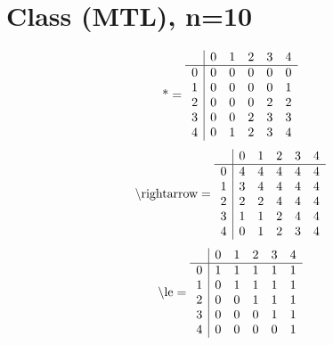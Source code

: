 \documentclass[11pt]{article}
\begin{document}
\section{Class (MTL), n=10}
\[\text{*} = 
\begin{array}{r | r r r r r}
 & 0 & 1 & 2 & 3 & 4 \\ \hline
0 & 0 & 0 & 0 & 0 & 0 \\
1 & 0 & 0 & 0 & 0 & 1 \\
2 & 0 & 0 & 0 & 2 & 2 \\
3 & 0 & 0 & 2 & 3 & 3 \\
4 & 0 & 1 & 2 & 3 & 4 \\
\end{array}
\]
\[\text{\textbackslash rightarrow} = 
\begin{array}{r | r r r r r}
 & 0 & 1 & 2 & 3 & 4 \\ \hline
0 & 4 & 4 & 4 & 4 & 4 \\
1 & 3 & 4 & 4 & 4 & 4 \\
2 & 2 & 2 & 4 & 4 & 4 \\
3 & 1 & 1 & 2 & 4 & 4 \\
4 & 0 & 1 & 2 & 3 & 4 \\
\end{array}
\]
\[\text{\textbackslash le} = 
\begin{array}{r | r r r r r}
 & 0 & 1 & 2 & 3 & 4 \\ \hline
0 & 1 & 1 & 1 & 1 & 1 \\
1 & 0 & 1 & 1 & 1 & 1 \\
2 & 0 & 0 & 1 & 1 & 1 \\
3 & 0 & 0 & 0 & 1 & 1 \\
4 & 0 & 0 & 0 & 0 & 1 \\
\end{array}
\]
\end{document}
